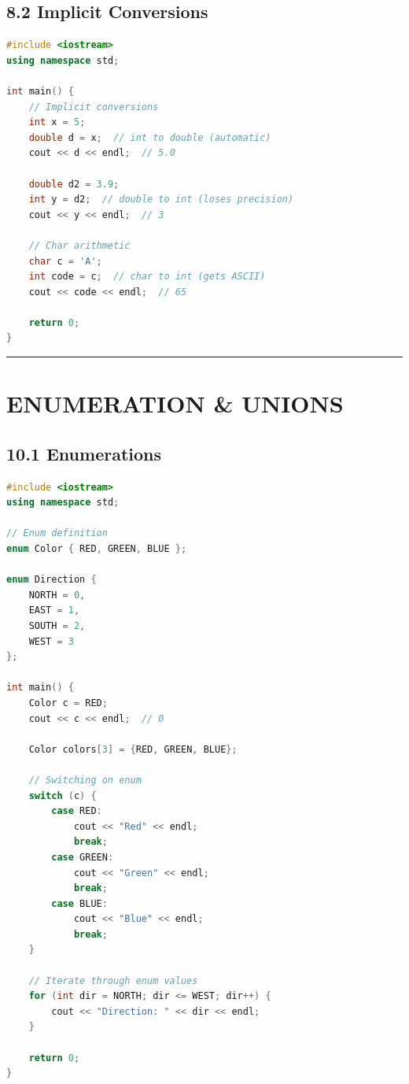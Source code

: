\hypertarget{implicit-conversions}{%
\section{8.2 Implicit Conversions}\label{implicit-conversions}}

\begin{lstlisting}[language={C++}]
#include <iostream>
using namespace std;

int main() {
    // Implicit conversions
    int x = 5;
    double d = x;  // int to double (automatic)
    cout << d << endl;  // 5.0
    
    double d2 = 3.9;
    int y = d2;  // double to int (loses precision)
    cout << y << endl;  // 3
    
    // Char arithmetic
    char c = 'A';
    int code = c;  // char to int (gets ASCII)
    cout << code << endl;  // 65
    
    return 0;
}
\end{lstlisting}

\begin{center}\rule{0.5\linewidth}{0.5pt}\end{center}

\hypertarget{enumeration-unions}{%
\chapter{ENUMERATION \& UNIONS}\label{enumeration-unions}}

\hypertarget{enumerations}{%
\section{10.1 Enumerations}\label{enumerations}}

\begin{lstlisting}[language={C++}]
#include <iostream>
using namespace std;

// Enum definition
enum Color { RED, GREEN, BLUE };

enum Direction {
    NORTH = 0,
    EAST = 1,
    SOUTH = 2,
    WEST = 3
};

int main() {
    Color c = RED;
    cout << c << endl;  // 0
    
    Color colors[3] = {RED, GREEN, BLUE};
    
    // Switching on enum
    switch (c) {
        case RED:
            cout << "Red" << endl;
            break;
        case GREEN:
            cout << "Green" << endl;
            break;
        case BLUE:
            cout << "Blue" << endl;
            break;
    }
    
    // Iterate through enum values
    for (int dir = NORTH; dir <= WEST; dir++) {
        cout << "Direction: " << dir << endl;
    }
    
    return 0;
}
\end{lstlisting}

